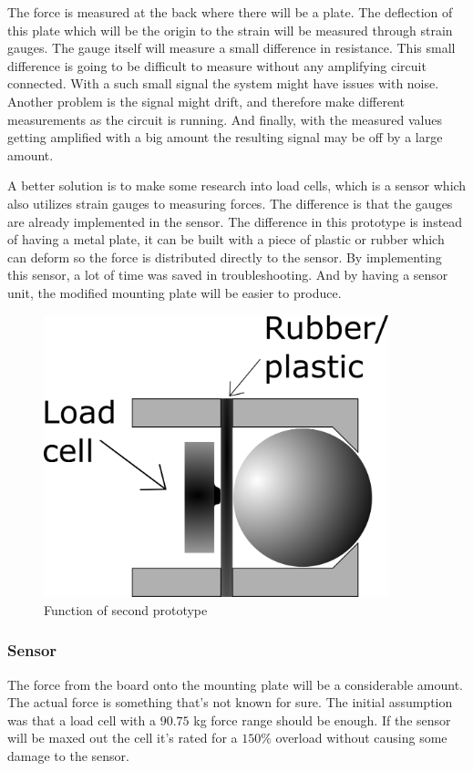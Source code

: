 The force is measured at the back where there will be a plate. The deflection of this plate which will be the origin to the strain will be measured through strain gauges. 
The gauge itself will measure a small difference in resistance. This small difference is going to be difficult to measure without any amplifying circuit connected. With a such small signal the system might have issues with noise. Another problem is the signal might drift, and therefore make different measurements as the circuit is running. And finally, with the measured values getting amplified with a big amount the resulting signal may be off by a large amount. 

A better solution is to make some research into load cells, which is a sensor which also utilizes strain gauges to measuring forces. The difference is that the gauges are already implemented in the sensor. The difference in this prototype is instead of having a metal plate, it can be built with a piece of plastic or rubber which can deform so the force is distributed directly to the sensor. By implementing this sensor, a lot of time was saved in troubleshooting. And by having a sensor unit, the modified mounting plate will be easier to produce. 
 
\begin{figure}[H]%
\begin{center}
	\includegraphics[width = 10cm]{Figures/Press_sens_func_2.png}
	\caption{Function of second prototype}
	\label{Press_sens_prot_2}
\end{center}
\end{figure}


\subsubsection{Sensor}
The force from the board onto the mounting plate will be a considerable amount. The actual force is something that’s not known for sure. The initial assumption was that a load cell with a $90.75$ kg force range should be enough. If the sensor will be maxed out the cell it's rated for a $150\%$ overload without causing some damage to the sensor.  


